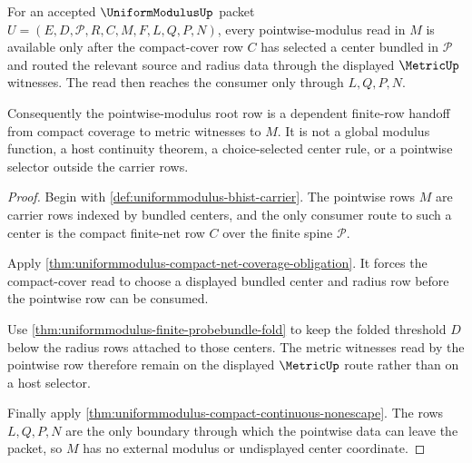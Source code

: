 \begin{theorem}
\label{thm:uniformmodulus-root-pointwise-modulus-row-totality}
For an accepted $\UniformModulusUp$ packet $U=(E,D,\mathcal{P},R,C,M,F,L,Q,P,N)$, every pointwise-modulus read in $M$ is available only after the compact-cover row $C$ has selected a center bundled in $\mathcal{P}$ and routed the relevant source and radius data through the displayed $\MetricUp$ witnesses. The read then reaches the consumer only through $L,Q,P,N$.

Consequently the pointwise-modulus root row is a dependent finite-row handoff from compact coverage to metric witnesses to $M$. It is not a global modulus function, a host continuity theorem, a choice-selected center rule, or a pointwise selector outside the carrier rows.
\end{theorem}
\begin{proof}
Begin with \autoref{def:uniformmodulus-bhist-carrier}. The pointwise rows $M$ are carrier rows indexed by bundled centers, and the only consumer route to such a center is the compact finite-net row $C$ over the finite spine $\mathcal{P}$.

Apply \autoref{thm:uniformmodulus-compact-net-coverage-obligation}. It forces the compact-cover read to choose a displayed bundled center and radius row before the pointwise row can be consumed.

Use \autoref{thm:uniformmodulus-finite-probebundle-fold} to keep the folded threshold $D$ below the radius rows attached to those centers. The metric witnesses read by the pointwise row therefore remain on the displayed $\MetricUp$ route rather than on a host selector.

Finally apply \autoref{thm:uniformmodulus-compact-continuous-nonescape}. The rows $L,Q,P,N$ are the only boundary through which the pointwise data can leave the packet, so $M$ has no external modulus or undisplayed center coordinate.
\end{proof}

